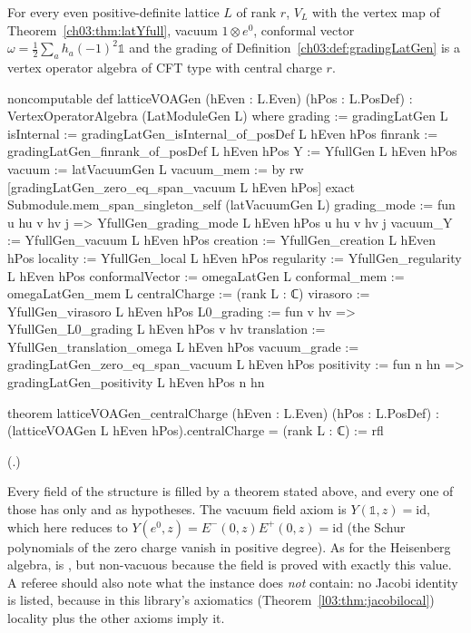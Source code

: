 \begin{theorem}\label{ch03:thm:latticeVOA}
For every even positive-definite lattice $L$ of rank $r$, $V_L$ with the vertex map of
Theorem~\ref{ch03:thm:latYfull}, vacuum $1\otimes e^0$, conformal vector
$\omega=\frac12\sum_ah_a(-1)^2\mathbb 1$ and the grading of Definition~\ref{ch03:def:gradingLatGen}
is a vertex operator algebra of CFT type with central charge $r$.
\end{theorem}
\begin{leancode}
noncomputable def latticeVOAGen (hEven : L.Even) (hPos : L.PosDef) :
    VertexOperatorAlgebra (LatModuleGen L) where
  grading := gradingLatGen L
  isInternal := gradingLatGen_isInternal_of_posDef L hEven hPos
  finrank := gradingLatGen_finrank_of_posDef L hEven hPos
  Y := YfullGen L hEven hPos
  vacuum := latVacuumGen L
  vacuum_mem := by
    rw [gradingLatGen_zero_eq_span_vacuum L hEven hPos]
    exact Submodule.mem_span_singleton_self (latVacuumGen L)
  grading_mode := fun u hu v hv j => YfullGen_grading_mode L hEven hPos u hu v hv j
  vacuum_Y := YfullGen_vacuum L hEven hPos
  creation := YfullGen_creation L hEven hPos
  locality := YfullGen_local L hEven hPos
  regularity := YfullGen_regularity L hEven hPos
  conformalVector := omegaLatGen L
  conformal_mem := omegaLatGen_mem L
  centralCharge := (rank L : ℂ)
  virasoro := YfullGen_virasoro L hEven hPos
  L0_grading := fun v hv => YfullGen_L0_grading L hEven hPos v hv
  translation := YfullGen_translation_omega L hEven hPos
  vacuum_grade := gradingLatGen_zero_eq_span_vacuum L hEven hPos
  positivity := fun n hn => gradingLatGen_positivity L hEven hPos n hn

theorem latticeVOAGen_centralCharge (hEven : L.Even) (hPos : L.PosDef) :
    (latticeVOAGen L hEven hPos).centralCharge = (rank L : ℂ) := rfl
\end{leancode}
(.)

\begin{dictionary}
Every field of the structure is filled by a theorem stated above, and every one of those has only
 and  as hypotheses. The vacuum field axiom  is
$Y(\mathbb 1,z)=\mathrm{id}$, which here reduces to $Y(e^0,z)=E^-(0,z)E^+(0,z)=\mathrm{id}$ (the
Schur polynomials of the zero charge vanish in positive degree). As for the Heisenberg algebra,
 is , but non-vacuous because the field
 is proved with exactly this value. A referee should also note what the instance
does \emph{not} contain: no Jacobi identity is listed, because in this library's axiomatics
(Theorem~\ref{l03:thm:jacobilocal}) locality plus the other axioms imply it.
\end{dictionary}

